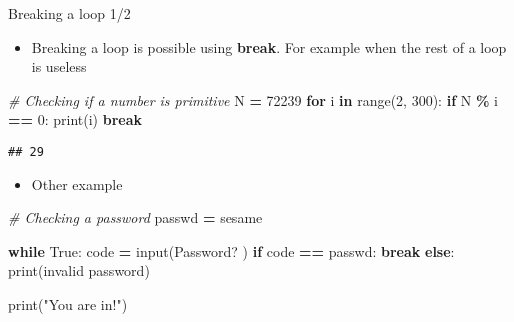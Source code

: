 \documentclass[
  8pt,
  ignorenonframetext,
]{beamer}
\newenvironment{Shaded}{\begin{snugshade}}{\end{snugshade}}
\newcommand{\BuiltInTok}[1]{#1}
\newcommand{\CommentTok}[1]{\textcolor[rgb]{0.56,0.35,0.01}{\textit{#1}}}
\newcommand{\ControlFlowTok}[1]{\textcolor[rgb]{0.13,0.29,0.53}{\textbf{#1}}}
\newcommand{\DecValTok}[1]{\textcolor[rgb]{0.00,0.00,0.81}{#1}}
\newcommand{\KeywordTok}[1]{\textcolor[rgb]{0.13,0.29,0.53}{\textbf{#1}}}
\newcommand{\NormalTok}[1]{#1}
\newcommand{\OperatorTok}[1]{\textcolor[rgb]{0.81,0.36,0.00}{\textbf{#1}}}
\newcommand{\StringTok}[1]{\textcolor[rgb]{0.31,0.60,0.02}{#1}}
\newcommand{\VariableTok}[1]{\textcolor[rgb]{0.00,0.00,0.00}{#1}}
\providecommand{\tightlist}{%
  \setlength{\itemsep}{0pt}\setlength{\parskip}{0pt}}
\begin{document}
\begin{frame}[fragile]{Breaking a loop 1/2}
\protect\hypertarget{breaking-a-loop-12}{}
\begin{itemize}
\tightlist
\item
  Breaking a loop is possible using \textbf{break}. For example when the
  rest of a loop is useless
\end{itemize}

\begin{Shaded}
\begin{Highlighting}[]
\CommentTok{\# Checking if a number is primitive}
\NormalTok{N }\OperatorTok{=} \DecValTok{72239}
\ControlFlowTok{for}\NormalTok{ i }\KeywordTok{in} \BuiltInTok{range}\NormalTok{(}\DecValTok{2}\NormalTok{, }\DecValTok{300}\NormalTok{):}
  \ControlFlowTok{if}\NormalTok{ N }\OperatorTok{\%}\NormalTok{ i }\OperatorTok{==} \DecValTok{0}\NormalTok{:}
    \BuiltInTok{print}\NormalTok{(i)}
    \ControlFlowTok{break} 
\end{Highlighting}
\end{Shaded}

\begin{verbatim}
## 29
\end{verbatim}

\begin{itemize}
\tightlist
\item
  Other example
\end{itemize}

\begin{Shaded}
\begin{Highlighting}[]
\CommentTok{\# Checking a password}
\NormalTok{passwd }\OperatorTok{=} \StringTok{\textquotesingle{}sesame\textquotesingle{}}

\ControlFlowTok{while} \VariableTok{True}\NormalTok{:}
\NormalTok{  code }\OperatorTok{=} \BuiltInTok{input}\NormalTok{(}\StringTok{\textquotesingle{}Password? \textquotesingle{}}\NormalTok{)}
  \ControlFlowTok{if}\NormalTok{ code }\OperatorTok{==}\NormalTok{ passwd:}
    \ControlFlowTok{break}
  \ControlFlowTok{else}\NormalTok{:}
    \BuiltInTok{print}\NormalTok{(}\StringTok{\textquotesingle{}invalid password\textquotesingle{}}\NormalTok{)}

\BuiltInTok{print}\NormalTok{(}\StringTok{"You are in!"}\NormalTok{)}
\end{Highlighting}
\end{Shaded}
\end{frame}
\end{document}
